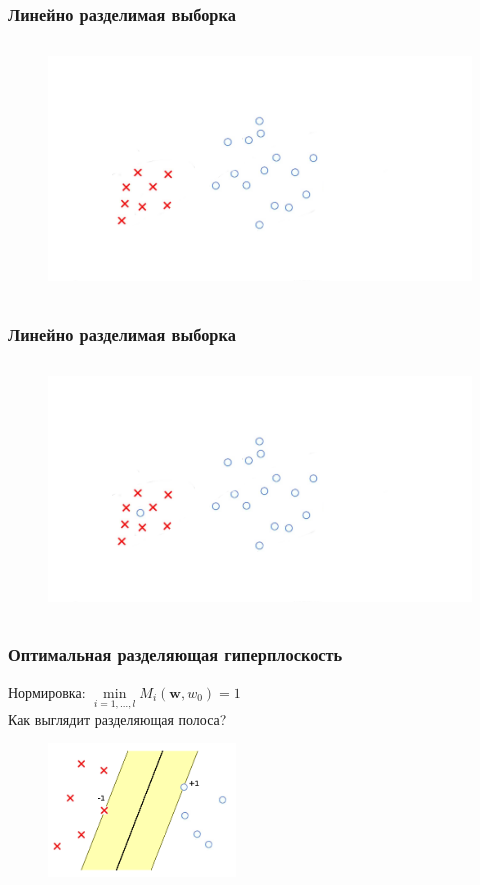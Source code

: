 \documentclass[12pt]{beamer}
\begin{document}
\begin{frame}\frametitle{Линейно разделимая выборка}
\begin{figure}[htbp]
  \includegraphics[height=190pt, keepaspectratio = true]{images/linearly_separable1}   
\end{figure}
\end{frame}

\begin{frame}\frametitle{Линейно разделимая выборка}
\begin{figure}[htbp]
  \includegraphics[height=190pt, keepaspectratio = true]{images/linearly_unseparable}   
\end{figure}
\end{frame}

\begin{frame}\frametitle{Оптимальная разделяющая гиперплоскость}
Нормировка: $\min\limits_{i = 1, \dots , l} M_i(\mathbf{w}, w_0) = 1$\\
Как выглядит разделяющая полоса?
\begin{figure}[htbp]
  \includegraphics[height=100pt, keepaspectratio = true]{images/linearly_separable3}   
\end{figure}
\end{frame}
\end{document}
